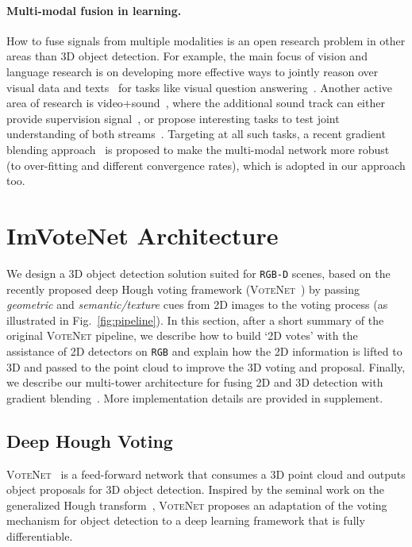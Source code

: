\documentclass[10pt,twocolumn,letterpaper]{article}
\newcommand{\votenet}{\textsc{VoteNet}\xspace}
\newcommand{\rgbd}{\texttt{RGB-D}\xspace}
\newcommand{\rgb}{\texttt{RGB}\xspace}
\begin{document}
\paragraph{Multi-modal fusion in learning.} How to fuse signals from multiple modalities is an open research problem in other areas than 3D object detection.
For example, the main focus of vision and language research is on developing more effective ways to jointly reason over visual data and texts~\cite{fukui2016multimodal,perez2018film,yu2018beyond} for tasks like visual question answering~\cite{antol2015vqa,johnson2017clevr}.
Another active area of research is video+sound~\cite{owens2016visually,gao20192}, where the additional sound track can either provide supervision signal~\cite{owens2016ambient}, or propose interesting tasks to test joint understanding of both streams~\cite{zhao2018sound}.
Targeting at all such tasks, a recent gradient blending approach~\cite{wang2019makes} is proposed to make the multi-modal network more robust (to over-fitting and different convergence rates), which is adopted in our approach too.


 
\section{ImVoteNet Architecture}
We design a 3D object detection solution suited for \rgbd scenes, based on the recently proposed deep Hough voting framework (\votenet~\cite{voteNet}) by passing \emph{geometric} and \emph{semantic/texture} cues from 2D images to the voting process (as illustrated in Fig.~\ref{fig:pipeline}).
In this section, after a short summary of the original \votenet pipeline, we describe how to build `2D votes' with the assistance of 2D detectors on \rgb and explain how the 2D information is lifted to 3D and passed to the point cloud to improve the 3D voting and proposal. Finally, we describe our multi-tower architecture for fusing 2D and 3D detection with gradient blending~\cite{wang2019makes}. More implementation details are provided in supplement.

\subsection{Deep Hough Voting}
\votenet~\cite{voteNet} is a feed-forward network that consumes a 3D point cloud and outputs object proposals for 3D object detection. Inspired by the seminal work on the generalized Hough transform~\cite{ballard1981generalizing}, \votenet proposes an adaptation of the voting mechanism for object detection to a deep learning framework that is fully differentiable. 
\end{document}
